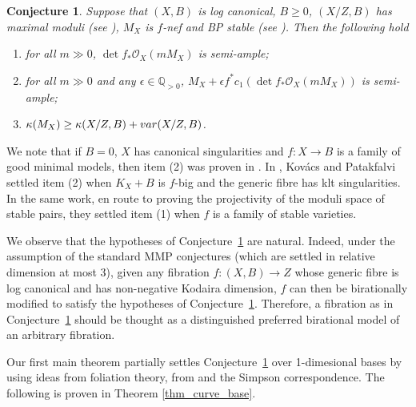 \documentclass[12pt]{amsart}
\theoremstyle{plain}
\newtheorem{conjecture}[theorem]{Conjecture}
\theoremstyle{definition}
\def\det{\operatorname{det}}
\def \QP {\mathbb Q_{>0}}
\begin{document}
\begin{conjecture}
\label{conj_shokurov}
Suppose that $(X, B)$ is log canonical, $B \geq 0$, $(X/Z, B)$ has maximal moduli
(see \cite[Definition 2.20]{ACSS}),
	$M_X$ is $f$-nef and BP stable (see \cite[Definition 2.5]{ACSS}).
Then the following hold

	\begin{enumerate}
			\setcounter{enumi}{0}
	\item for all $m \gg 0$, $\det f_*\mathcal O_X(mM_X)$ is semi-ample;
	
	\item for all $m \gg 0$ and any  $\epsilon \in \QP$, 
$M_X+\epsilon f^*c_1( \det f_*\mathcal O_X(mM_X))$ is semi-ample;

\item $\kappa(M_X) \geq \kappa(X/Z, B)+{\rm var}(X/Z, B)$.
\end{enumerate}
\end{conjecture}


We note that if $B = 0$, $X$ has canonical singularities and $f\colon X \rightarrow B$ is a family
of good minimal models, then item (2) was proven in \cite{Kawamata85a}.
In \cite{KP17}, Kov\'{a}cs and Patakfalvi settled item (2) 
when $K_X+B$ is $f$-big and the generic fibre has klt singularities.
In the same work, en route to proving the projectivity of the moduli 
space of stable pairs, 
they settled item (1) when $f$ is a family of stable varieties.

We observe that the hypotheses of Conjecture~\ref{conj_shokurov} are natural.
Indeed, under the assumption of the standard MMP conjectures (which are settled in relative dimension at most 3), given any fibration $f \colon (X,B) \rightarrow Z$ whose generic fibre is log canonical and has non-negative Kodaira dimension, $f$ can then be birationally modified to satisfy the hypotheses of Conjecture~\ref{conj_shokurov}.
Therefore, a fibration as in Conjecture~\ref{conj_shokurov} should be thought as a distinguished preferred birational model of an arbitrary fibration.


Our first main theorem partially settles Conjecture~\ref{conj_shokurov} over 1-dimesional bases 
by using ideas from foliation theory, from \cite{MR3959071}
and the Simpson correspondence.
The following is proven in Theorem \ref{thm_curve_base}.
\end{document}
